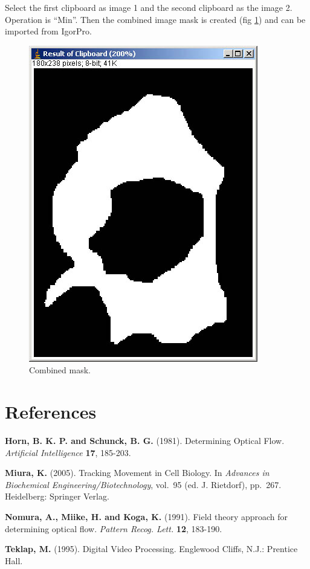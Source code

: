 \documentclass{article}
\begin{document}
Select the first clipboard as image 1 and the second clipboard as the
image 2. Operation is ``Min''. Then the combined image mask is created (fig \ref{fig:finalmask}) and can be
imported from IgorPro.

\begin{figure}[htbp]
\centering
\includegraphics[scale=0.4]{img/maskfinal.jpg}
\caption{Combined mask.}
\label{fig:finalmask}
\end{figure}

\section{References}\label{references}

\textbf{Horn, B. K. P. and Schunck, B. G.} (1981). Determining Optical
Flow. \emph{Artificial Intelligence} \textbf{17}, 185-203.

\textbf{Miura, K.} (2005). Tracking Movement in Cell Biology. In
\emph{Advances in Biochemical Engineering/Biotechnology}, vol.~95 (ed.
J. Rietdorf), pp.~267. Heidelberg: Springer Verlag.

\textbf{Nomura, A., Miike, H. and Koga, K.} (1991). Field theory
approach for determining optical flow. \emph{Pattern Recog. Lett.}
\textbf{12}, 183-190.

\textbf{Teklap, M.} (1995). Digital Video Processing. Englewood Cliffs,
N.J.: Prentice Hall.
\end{document}
